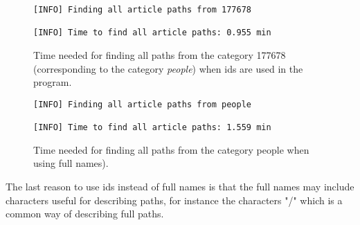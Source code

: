 \begin{figure}[h]
\centering
\begin{lstlisting}
[INFO] Finding all article paths from 177678

[INFO] Time to find all article paths: 0.955 min
\end{lstlisting}
\caption[Time for all paths for \emph{people} when using ids]{Time needed for finding all paths from the category 177678 (corresponding to the category \emph{people}) when ids are used in the program.}
\label{fig:id_lookup}
\end{figure}


\begin{figure}[h]
\centering
\begin{lstlisting}
[INFO] Finding all article paths from people

[INFO] Time to find all article paths: 1.559 min
\end{lstlisting}
\caption[Time for all paths for \emph{people} when using full names]{Time needed for finding all paths from the category people when using full names).}
\label{fig:fullname_lookup}
\end{figure}
 
The last reason to use ids instead of full names is that the full names may include characters useful for describing paths, for instance the characters "/" which is a common way of describing full paths. 



